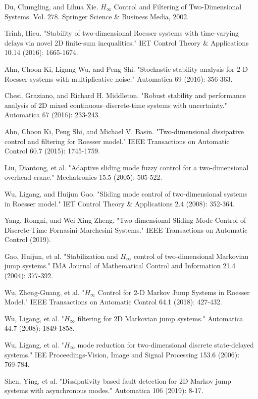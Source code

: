 \documentclass[conference]{IEEEtran}
\begin{document}
\begin{thebibliography}{1}
	Du, Chungling, and Lihua Xie. $H_{\infty}$ Control and Filtering of Two-Dimensional Systems. Vol. 278. Springer Science \& Business Media, 2002.
	
	Trinh, Hieu. "Stability of two-dimensional Roesser systems with time-varying delays via novel 2D finite-sum inequalities." IET Control Theory \& Applications 10.14 (2016): 1665-1674.
	
	Ahn, Choon Ki, Ligang Wu, and Peng Shi. "Stochastic stability analysis for 2-D Roesser systems with multiplicative noise." Automatica 69 (2016): 356-363.
	
	Chesi, Graziano, and Richard H. Middleton. "Robust stability and performance analysis of 2D mixed continuous–discrete-time systems with uncertainty." Automatica 67 (2016): 233-243.
	
	Ahn, Choon Ki, Peng Shi, and Michael V. Basin. "Two-dimensional dissipative control and filtering for Roesser model." IEEE Transactions on Automatic Control 60.7 (2015): 1745-1759.
	
	Liu, Diantong, et al. "Adaptive sliding mode fuzzy control for a two-dimensional overhead crane." Mechatronics 15.5 (2005): 505-522.
	
	Wu, Ligang, and Huijun Gao. "Sliding mode control of two-dimensional systems in Roesser model." IET Control Theory \& Applications 2.4 (2008): 352-364.
	
	Yang, Rongni, and Wei Xing Zheng. "Two-dimensional Sliding Mode Control of Discrete-Time Fornasini-Marchesini Systems." IEEE Transactions on Automatic Control (2019).
	
	Gao, Huijun, et al. "Stabilization and $H_{\infty}$ control of two-dimensional Markovian jump systems." IMA Journal of Mathematical Control and Information 21.4 (2004): 377-392.
	
	Wu, Zheng-Guang, et al. "$H_{\infty}$ Control for 2-D Markov Jump Systems in Roesser Model." IEEE Transactions on Automatic Control 64.1 (2018): 427-432.
	
	Wu, Ligang, et al. "$H_{\infty}$ filtering for 2D Markovian jump systems." Automatica 44.7 (2008): 1849-1858.
	
	Wu, Ligang, et al. "$H_{\infty}$ mode reduction for two-dimensional discrete state-delayed systems." IEE Proceedings-Vision, Image and Signal Processing 153.6 (2006): 769-784.
	
	
	Shen, Ying, et al. "Dissipativity based fault detection for 2D Markov jump systems with asynchronous modes." Automatica 106 (2019): 8-17.
	
	
	
	
	
	
	
	
\end{thebibliography}




\end{document}
